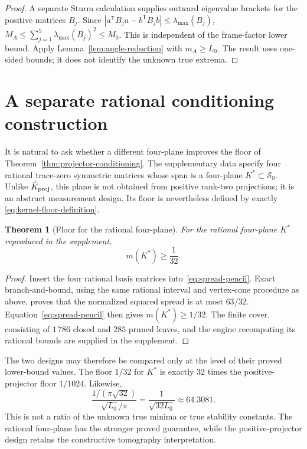 \documentclass[12pt]{article}
\newtheorem{theorem}{Theorem}[section]
\theoremstyle{definition}
\theoremstyle{remark}
\begin{document}
\begin{proof}
A separate Sturm calculation supplies outward eigenvalue brackets for the
positive matrices $B_j$.  Since
$|a^{\mathsf T}B_ja-b^{\mathsf T}B_jb|\leq\lambda_{\max}(B_j)$,
$M_A\leq\sum_{j=1}^5\lambda_{\max}(B_j)^2\leq M_0$.
This is independent of the frame-factor lower bound.
Apply Lemma~\ref{lem:angle-reduction} with
$m_A\geq L_0$.  The result uses one-sided bounds; it does not identify the
unknown true extrema.
\end{proof}

\section{A separate rational conditioning construction}
\label{sec:kstar-conditioning}

It is natural to ask whether a different four-plane improves the floor of
Theorem~\ref{thm:projector-conditioning}.  The supplementary data specify four
rational trace-zero symmetric matrices whose span is a four-plane
$K^\ast\subset\mathcal S_0$.  Unlike $\widehat K_{\rm proj}$, this plane is
not obtained from positive rank-two projections; it is an abstract
measurement design.  Its floor is nevertheless defined by exactly
\eqref{eq:kernel-floor-definition}.

\begin{theorem}[Floor for the rational four-plane]
\label{thm:kstar-floor}
For the rational four-plane $K^\ast$ reproduced in the supplement,
\[
  m(K^\ast)\geq \frac{1}{32}.
\]
\end{theorem}

\begin{proof}
Insert the four rational basis matrices into~\eqref{eq:spread-pencil}.  Exact
branch-and-bound, using the same rational interval and vertex-cone procedure
as above, proves that the normalized squared spread is at most $63/32$.
Equation~\eqref{eq:spread-pencil} then gives $m(K^\ast)\geq1/32$.  The finite
cover, consisting of $1\,786$ closed and $285$ pruned leaves, and the engine
recomputing its rational bounds are supplied in the supplement.
\end{proof}

The two designs may therefore be compared only at the level of their
proved lower-bound values.  The floor $1/32$ for $K^\ast$ is exactly
$32$ times the positive-projector floor $1/1024$.  Likewise,
\[
 \frac{1/(\pi\sqrt{32})}{\sqrt{L_0}/\pi}
 =\frac1{\sqrt{32L_0}}\approx64.3081.
\]
This is not a ratio of the unknown true minima or true stability constants.
The rational four-plane has the stronger proved guarantee, while the
positive-projector design retains the constructive tomography interpretation.
\end{document}
